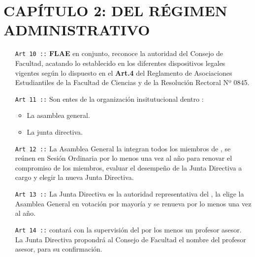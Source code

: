 \section*{CAPÍTULO 2:  DEL RÉGIMEN ADMINISTRATIVO}
\begin{itemize}
  \item [\texttt{Art 10 ::}] \textbf{FLAE} en conjunto, reconoce la autoridad del Consejo de Facultad, acatando lo
  establecido en los diferentes dispositivos legales vigentes según lo dispuesto en el
  \textbf{Art.4} del Reglamento de Asociaciones Estudiantiles de la Facultad de Ciencias
  y de la Resolución Rectoral Nº 0845.
  \item [\texttt{Art 11 ::}] Son entes de la organización insitutucional dentro \flae:
  \begin{itemize}
    \item La asamblea general.
    \item La junta directiva.
  \end{itemize}
  \item [\texttt{Art 12 ::}] La Asamblea General la integran todos los miembros de \flae, se reúnen en
  Sesión Ordinaria por lo menos una vez al año para renovar el compromiso de los miembros, evaluar el desempeño de la Junta Directiva a cargo y elegir la nueva Junta Directiva.
  \item [\texttt{Art 13 ::}] La Junta Directiva es la autoridad representativa del  \flae, la elige la Asamblea
  General en votación por mayoría y se renueva por lo menos una vez al año.
  \item [\texttt{Art 14 ::}] \flae  contará con la supervisión del por los menos un profesor asesor. La Junta
  Directiva propondrá al Consejo de Facultad el nombre del profesor asesor, para su confirmación.
\end{itemize}


